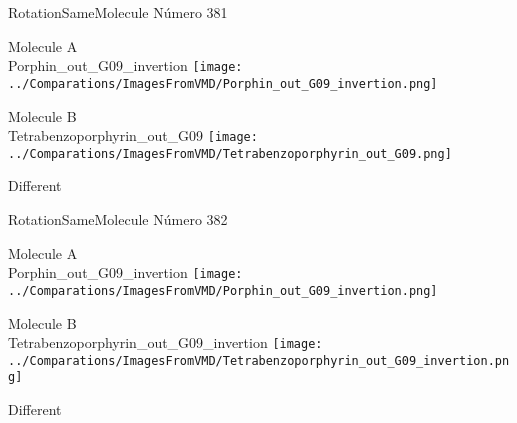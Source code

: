 \vtab[-2cm]
\begin{center}
{\large RotationSameMolecule \tab Número 381}
\end{center}
\begin{multicols}{2}
\begin{center}
Molecule A \\ 
Porphin\_out\_G09\_invertion
\texttt{[image: ../Comparations/ImagesFromVMD/Porphin\_out\_G09\_invertion.png]}
\\
\vtab

\columnbreak
Molecule B \\ 
Tetrabenzoporphyrin\_out\_G09
\texttt{[image: ../Comparations/ImagesFromVMD/Tetrabenzoporphyrin\_out\_G09.png]}
\\
\vtab


\end{center}
\end{multicols}
\begin{center}
\vtab
\vtab
\textcolor{NavyBlue}{\Large Different}
\end{center}

 \newpage

\vtab[-2cm]
\begin{center}
{\large RotationSameMolecule \tab Número 382}
\end{center}
\begin{multicols}{2}
\begin{center}
Molecule A \\ 
Porphin\_out\_G09\_invertion
\texttt{[image: ../Comparations/ImagesFromVMD/Porphin\_out\_G09\_invertion.png]}
\\
\vtab

\columnbreak
Molecule B \\ 
Tetrabenzoporphyrin\_out\_G09\_invertion
\texttt{[image: ../Comparations/ImagesFromVMD/Tetrabenzoporphyrin\_out\_G09\_invertion.png]}
\\
\vtab


\end{center}
\end{multicols}
\begin{center}
\vtab
\vtab
\textcolor{NavyBlue}{\Large Different}
\end{center}

 \newpage


